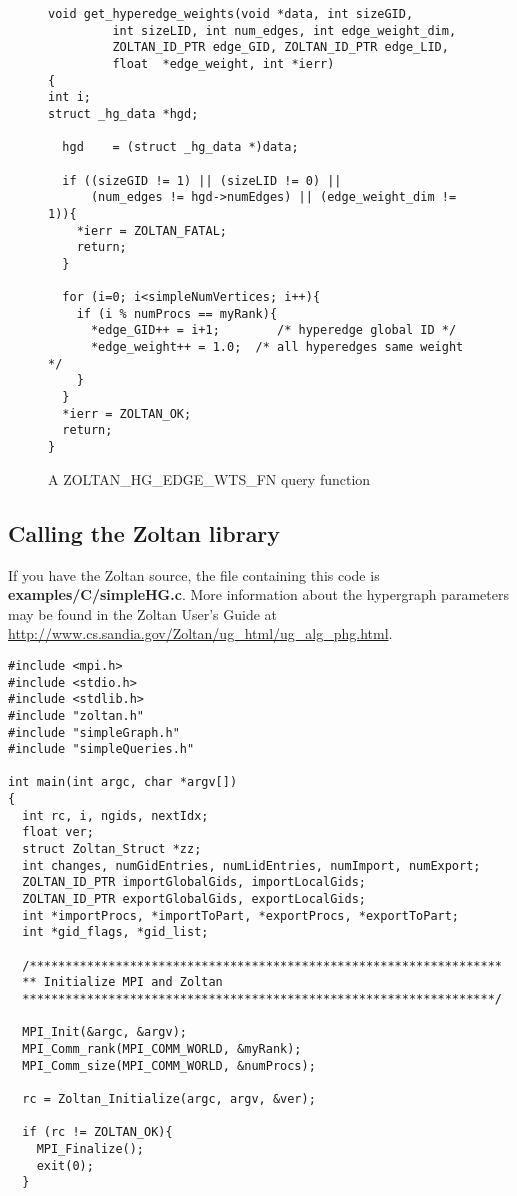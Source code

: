 \begin{figure}
\begin{flushleft}
\begin{verbatim}
void get_hyperedge_weights(void *data, int sizeGID,
         int sizeLID, int num_edges, int edge_weight_dim,
         ZOLTAN_ID_PTR edge_GID, ZOLTAN_ID_PTR edge_LID,
         float  *edge_weight, int *ierr)
{
int i;
struct _hg_data *hgd;

  hgd    = (struct _hg_data *)data;

  if ((sizeGID != 1) || (sizeLID != 0) ||
      (num_edges != hgd->numEdges) || (edge_weight_dim != 1)){
    *ierr = ZOLTAN_FATAL;
    return;
  }

  for (i=0; i<simpleNumVertices; i++){
    if (i % numProcs == myRank){
      *edge_GID++ = i+1;        /* hyperedge global ID */
      *edge_weight++ = 1.0;  /* all hyperedges same weight */
    }
  }
  *ierr = ZOLTAN_OK;
  return;
}
\end{verbatim}
\end{flushleft}
\caption{A ZOLTAN\_HG\_EDGE\_WTS\_FN query function}
\label{fig:EW}
\end{figure}

\clearpage
\subsection{Calling the Zoltan library}
If you have the Zoltan source, the file containing this
code is \textbf{examples/C/simpleHG.c}.
More information about the hypergraph parameters
may be found in the Zoltan User's Guide at
\url{http://www.cs.sandia.gov/Zoltan/ug_html/ug_alg_phg.html}.

\begin{flushleft}
\begin{verbatim}
#include <mpi.h>
#include <stdio.h>
#include <stdlib.h>
#include "zoltan.h"
#include "simpleGraph.h"
#include "simpleQueries.h"

int main(int argc, char *argv[])
{
  int rc, i, ngids, nextIdx;
  float ver;
  struct Zoltan_Struct *zz;
  int changes, numGidEntries, numLidEntries, numImport, numExport;
  ZOLTAN_ID_PTR importGlobalGids, importLocalGids;
  ZOLTAN_ID_PTR exportGlobalGids, exportLocalGids;
  int *importProcs, *importToPart, *exportProcs, *exportToPart;
  int *gid_flags, *gid_list;

  /******************************************************************
  ** Initialize MPI and Zoltan
  ******************************************************************/

  MPI_Init(&argc, &argv);
  MPI_Comm_rank(MPI_COMM_WORLD, &myRank);
  MPI_Comm_size(MPI_COMM_WORLD, &numProcs);

  rc = Zoltan_Initialize(argc, argv, &ver);

  if (rc != ZOLTAN_OK){
    MPI_Finalize();
    exit(0);
  }
\end{verbatim}
\end{flushleft}


